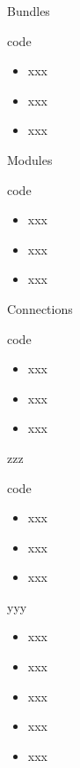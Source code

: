 \documentclass[xcolor=pdflatex,dvipsnames,table]{beamer}
\begin{document}
\begin{frame}[fragile]{Bundles}
\begin{chisel}
code
\end{chisel}
\begin{itemize}
\item xxx
\item xxx
\item xxx
\end{itemize}
\end{frame}

\begin{frame}[fragile]{Modules}
\begin{chisel}
code
\end{chisel}
\begin{itemize}
\item xxx
\item xxx
\item xxx
\end{itemize}
\end{frame}

\begin{frame}[fragile]{Connections}
\begin{chisel}
code
\end{chisel}
\begin{itemize}
\item xxx
\item xxx
\item xxx
\end{itemize}
\end{frame}

\begin{frame}[fragile]{zzz}
\begin{chisel}
code
\end{chisel}
\begin{itemize}
\item xxx
\item xxx
\item xxx
\end{itemize}
\end{frame}

\begin{frame}[fragile]{yyy}
\begin{itemize}
\item xxx
\item xxx
\item xxx
\item xxx
\item xxx
\end{itemize}
\end{frame}
\end{document}
